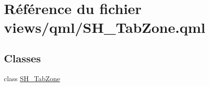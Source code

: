 \hypertarget{SH__TabZone_8qml}{\section{Référence du fichier views/qml/\-S\-H\-\_\-\-Tab\-Zone.qml}
\label{SH__TabZone_8qml}
}
\subsection*{Classes}
\begin{DoxyCompactItemize}
\item 
class \hyperlink{classSH__TabZone}{S\-H\-\_\-\-Tab\-Zone}
\end{DoxyCompactItemize}
